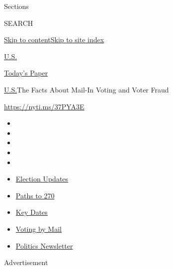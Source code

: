Sections

SEARCH

\protect\hyperlink{site-content}{Skip to
content}\protect\hyperlink{site-index}{Skip to site index}

\href{https://www.nytimes3xbfgragh.onion/section/us}{U.S.}

\href{https://myaccount.nytimes3xbfgragh.onion/auth/login?response_type=cookie\&client_id=vi}{}

\href{https://www.nytimes3xbfgragh.onion/section/todayspaper}{Today's
Paper}

\href{/section/us}{U.S.}\textbar{}The Facts About Mail-In Voting and
Voter Fraud

\url{https://nyti.ms/37PYA3E}

\begin{itemize}
\item
\item
\item
\item
\item
\end{itemize}

\begin{itemize}
\item
  \href{https://www.nytimes3xbfgragh.onion/live/2020/09/11/us/trump-vs-biden?action=click\&pgtype=Article\&state=default\&region=TOP_BANNER\&context=storylines_menu}{Election
  Updates}
\item
  \href{https://www.nytimes3xbfgragh.onion/interactive/2020/us/elections/election-states-biden-trump.html?action=click\&pgtype=Article\&state=default\&region=TOP_BANNER\&context=storylines_menu}{Paths
  to 270}
\item
  \href{https://www.nytimes3xbfgragh.onion/interactive/2019/us/elections/2020-presidential-election-calendar.html?action=click\&pgtype=Article\&state=default\&region=TOP_BANNER\&context=storylines_menu}{Key
  Dates}
\item
  \href{https://www.nytimes3xbfgragh.onion/interactive/2020/08/31/us/politics/vote-by-mail-deadlines.html?action=click\&pgtype=Article\&state=default\&region=TOP_BANNER\&context=storylines_menu}{Voting
  by Mail}
\item
  \href{https://www.nytimes3xbfgragh.onion/newsletters/politics?action=click\&pgtype=Article\&state=default\&region=TOP_BANNER\&context=storylines_menu}{Politics
  Newsletter}
\end{itemize}

Advertisement

